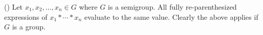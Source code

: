   \textnormal{()}
  Let $x_1, x_2, ..., x_n \in G$ where $G$ is a semigroup.
  All fully re-parenthesized expressions of $x_1 * \cdots * x_n$
  evaluate to the same value.
  Clearly the above applies if $G$ is a group.
